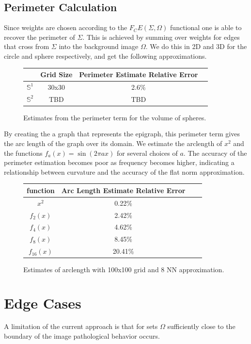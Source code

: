 \documentclass[12pt]{article}
\begin{document}
\subsection{Perimeter Calculation}

Since weights are chosen according to the $F_CE(\Sigma,\Omega)$ functional one is able to recover the perimeter of $\Sigma$. This is achieved by summing over weights for edges that cross from $\Sigma$ into the background image $\Omega$. We do this in 2D and 3D for the circle and sphere respectively, and get the following approximations.

\begin{figure}[H]
	\centering
	\begin{tabular}{|c|c|c|c|}
		\hline
		&  Grid Size & Perimeter Estimate Relative Error  \\
		\hline
		$\mathbb{S}^1$ & 30x30 &  2.6\%  \\
		\hline
		$\mathbb{S}^2$ & TBD & TBD    \\
		\hline
	\end{tabular}
	\caption{Estimates from the perimeter term for the volume of spheres.}
\end{figure}

By creating the a graph that represents the epigraph, this perimeter term gives the arc length of the graph over its domain. We estimate the arclength of $x^2$ and the functions $f_a(x) = \sin(2\pi ax)$ for several choices of $a$. The accuracy of the perimeter estimation becomes poor as frequency becomes higher, indicating a relationship between curvature and the accuracy of the flat norm approximation.

\begin{figure}[H]
	\centering
	\begin{tabular}{|c|c|c|c|}
		\hline
		function & Arc Length Estimate Relative Error  \\
		\hline
		$x^2$   &  0.22\%  \\
		\hline
		$f_{2}(x)$  & 2.42\%    \\
		\hline
		$f_{4}(x)$  & 4.62\%    \\
		\hline
		$f_{8}(x)$  & 8.45\%    \\
		\hline
		$f_{16}(x)$  & 20.41\%    \\
		\hline
	\end{tabular}
	\caption{Estimates of arclength with 100x100 grid and 8 NN approximation.}
\end{figure}

\section{Edge Cases}

A limitation of the current approach is that for sets $\Omega$ sufficiently close to the boundary of the image pathological behavior occurs.



\end{document}
